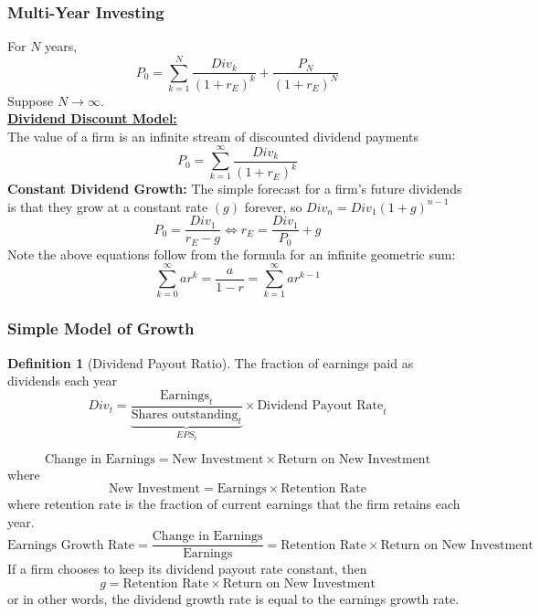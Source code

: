 \documentclass[11pt]{article}
\theoremstyle{definition}
\newtheorem*{definition}{Definition}
\begin{document}
\subsubsection{Multi-Year Investing}
For $N$ years,
\begin{equation*}
    P_0 = \sum_{k=1}^N \frac{Div_k}{(1 + r_E)^k} + \frac{P_N}{(1 + r_E)^N}
\end{equation*}
Suppose $N \to \infty$.\\
\textbf{\underline{Dividend Discount Model:}}\\
The value of a firm is an infinite stream of discounted dividend payments
\begin{equation*}
    P_0 = \sum_{k=1}^\infty \frac{Div_k}{(1  + r_E)^k}
\end{equation*}
\textbf{Constant Dividend Growth:} The simple forecast for a firm's future dividends is that they grow at a constant rate $(g)$ forever, so $Div_n = Div_1(1 + g)^{n-1}$
\begin{equation*}
    P_0 = \frac{Div_1}{r_E - g} \iff r_E = \frac{Div_1}{P_0} + g
\end{equation*}
Note the above equations follow from the formula for an infinite geometric sum:
\begin{equation*}
    \sum_{k=0}^\infty ar^k = \frac{a}{1-r} = \sum_{k=1}^\infty ar^{k-1}
\end{equation*}
\subsubsection{Simple Model of Growth}
\begin{definition}[Dividend Payout Ratio]
    The fraction of earnings paid as dividends each year
    \begin{equation*}
        Div_t  = \underbrace{\frac{\text{Earnings}_t}{\text{Shares outstanding}_t}}_{EPS_t} \times \text{Dividend Payout Rate}_t
    \end{equation*}
\end{definition}
\begin{equation*}
    \text{Change in Earnings} = \text{New Investment} \times \text{Return on New Investment}
\end{equation*}
where 
\begin{equation*}
    \text{New Investment} = \text{Earnings} \times \text{Retention Rate}
\end{equation*}
where retention rate is the fraction of current earnings that the firm retains each year. 
\begin{equation*}
    \text{Earnings Growth Rate} = \frac{\text{Change in Earnings}}{\text{Earnings}} = \text{Retention Rate} \times \text{Return on New Investment}
\end{equation*}
If a firm chooses to keep its dividend payout rate constant, then
\begin{equation*}
    g = \text{Retention Rate} \times \text{Return on New Investment}
\end{equation*}
or in other words, the dividend growth rate is equal to the earnings growth rate.
\end{document}
